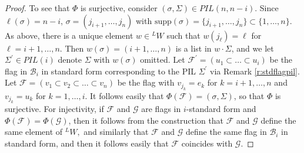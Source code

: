 \documentclass[12pt]{amsart}
\numberwithin{equation}{section}
\theoremstyle{remark}
\theoremstyle{definition}
\newcommand{\B}{\mathcal{B}}
\newcommand{\F}{\mathcal{F}}
\newcommand{\G}{\mathcal{G}}
\begin{document}
\begin{proof}
To see that $\Phi$ is surjective, consider  $(\sigma, \Sigma)\in PIL(n,n-i)$.  Since $\ell(\sigma)=n-i$, $\sigma=(j_{i+1},\dots, j_{n})$ with $\mbox{supp}(\sigma)=\{j_{i+1},\dots, j_{n}\}\subset \{1,\dots, n\}.$  As above, there is a unique element  $w\in{}^{L}W$ such that $w(j_{\ell})=\ell$ for $\ell=i+1, \dots, n.$ Then $w(\sigma)=(i+1, \dots, n)$ is a list in $w\cdot \Sigma$, and we let $\Sigma^{\prime}\in PIL(i)$ denote $\Sigma$ with $w(\sigma)$ omitted.   Let $\F^{\prime}=(u_1 \subset \dots \subset u_i)$ be the flag in $\B_{i}$ in standard form corresponding to the PIL $\Sigma^{\prime}$ via Remark \ref{r:stdflagpil}.  Let  $\F=(v_{1}\subset v_{2}\subset\dots\subset v_{n})$ be the flag with $v_{j_{k}}=e_{k}$ for $k=i+1,\dots, n$ and $v_{j_k}=u_k$ for $k=1, \dots, i.$   It follows easily that $\Phi(\F)=(\sigma,\Sigma)$, so that $\Phi$ is surjective.  For injectivity, if  $\F$ and $\G$ are flags in $i$-standard form and $\Phi(\F)=\Phi(\G)$, then it follows from the construction that $\F$ and $\G$ define the same element of ${}^LW,$ and similarly that $\F$ and $\G$ define the same flag in $\B_{i}$ in standard form, and then it follows easily  that $\F$ coincides with $\G$.

\end{proof}
\end{document}
